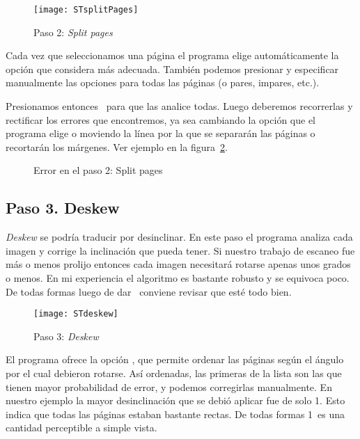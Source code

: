 \documentclass[%
	a5paper,
	10pt,
	twoside,
	openright,
	final,
]{memoir}
\begin{document}
	\begin{figure}
		\centering
		\texttt{[image: STsplitPages]}
		\caption{Paso 2: \emph{Split pages}\label{fig:STsplitPages}}
	\end{figure}

	Cada vez que seleccionamos una página el programa elige automáticamente la opción que considera más adecuada. También podemos presionar  y especificar manualmente las opciones para todas las páginas (o pares, impares, etc.).

	Presionamos entonces \play\ para que las analice todas. Luego deberemos recorrerlas y rectificar los errores que encontremos, ya sea cambiando la opción que el programa elige o moviendo la línea por la que se separarán las páginas o recortarán los márgenes. Ver ejemplo en la figura~\ref{fig:STsplitPagesError}.

	\begin{figure}
		\centering
		\hfill
		\caption{Error en el paso 2: Split pages\label{fig:STsplitPagesError}}
	\end{figure}

	\subsection{Paso 3. Deskew\label{sec:STdeskew}} \emph{Deskew} se podría traducir por desinclinar. En este paso el programa analiza cada imagen y corrige la inclinación que pueda tener. Si nuestro trabajo de escaneo fue más o menos prolijo entonces cada imagen necesitará rotarse apenas unos grados o menos. En mi experiencia el algoritmo es bastante robusto y se equivoca poco. De todas formas luego de dar \play\ conviene revisar que esté todo bien.

	\begin{figure}
		\centering
		\texttt{[image: STdeskew]}
		\caption{Paso 3: \emph{Deskew}\label{fig:STdeskew}}
	\end{figure}

	El programa ofrece la opción , que permite ordenar las páginas según el ángulo por el cual debieron rotarse. Así ordenadas, las primeras de la lista son las que tienen mayor probabilidad de error, y podemos corregirlas manualmente. En nuestro ejemplo la mayor desinclinación que se debió aplicar fue de solo 1\textdegree. Esto indica que todas las páginas estaban bastante rectas. De todas formas 1\textdegree\ es una cantidad perceptible a simple vista.
\end{document}

